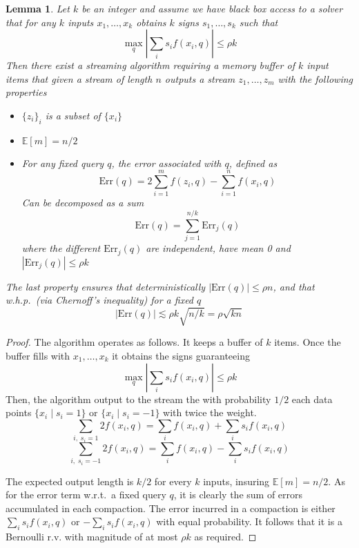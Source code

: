 \documentclass{article} %
\newtheorem{lemma}[theorem]{Lemma}
\newcommand{\el}[1]{\textcolor{blue}{EL: #1}}
\newcommand{\E}{\mathbb{E}}
\begin{document}
\begin{lemma} \label{lem:compactor}
Let $k$ be an integer and assume we have black box access to a solver that for any $k$ inputs $x_1,\ldots,x_k$ obtains $k$ signs $s_1,\ldots,s_k$ such that
$$\max_q \left| \sum_i s_i f(x_i, q)\right| \leq \rho k$$
Then there exist a streaming algorithm requiring a memory buffer of $k$ input items that given a stream of length $n$ outputs a stream $z_1,\ldots,z_m$ with the following properties
\begin{itemize}
\item $\{z_i\}_i$ is a subset of $\{x_i\}$
\item $\E[m] = n/2$
\item For any fixed query $q$, the error associated with $q$, defined as
$$\text{Err}(q) = 2\sum_{i=1}^m f(z_i,q) - \sum_{i=1}^n f(x_i,q)  $$
Can be decomposed as a sum
$$\text{Err}(q) = \sum_{j=1}^{n/k} \text{Err}_j(q)$$
where the different $\text{Err}_j(q)$ are independent, have mean 0 and $|\text{Err}_j(q)| \leq \rho k$
\end{itemize}
The last property ensures that deterministically $|\text{Err}(q)| \leq \rho n$, and that w.h.p.\ (via Chernoff's inequality) for a fixed $q$ 
$$|\text{Err}(q)| \lesssim \rho k\sqrt{n/k} = \rho \sqrt{kn}$$
\end{lemma}
\begin{proof}
The algorithm operates as follows. It keeps a buffer of $k$ items. Once the buffer fills with $x_1,\ldots,x_k$ it obtains the signs guaranteeing
$$\max_q \left| \sum_i s_i f(x_i, q)\right| \leq \rho k$$
Then, the algorithm output to the stream the with probability $1/2$ each data points $\{x_i \; | \; s_i = 1\}$ or $\{x_i \; | \; s_i = -1\}$ with twice the weight.
$$\sum_{i ,\; s_i=1} 2f(x_i, q) = \sum_{i} f(x_i, q) +  \sum_{i} s_i f(x_i, q)$$
$$\sum_{i ,\; s_i=-1} 2f(x_i, q) = \sum_{i} f(x_i, q) - \sum_{i} s_i f(x_i, q)$$

The expected output length is $k/2$ for every $k$ inputs, insuring $\E[m]=n/2$. 
As for the error term w.r.t.\ a fixed query $q$, it is clearly the sum of errors accumulated in each compaction. The error incurred in a compaction is either 
$\sum_i s_i f(x_i, q)$ or $-\sum_i s_i f(x_i, q)$ with equal probability. It follows that it is a Bernoulli r.v. with magnitude of at most $\rho k$ as required.
\end{proof}
\end{document}

